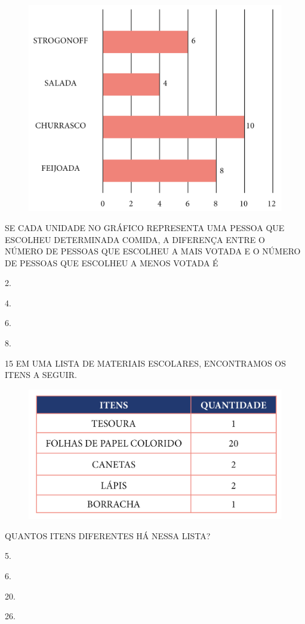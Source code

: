 \begin{figure}[htpb!]
\centering
\includegraphics[width=.8\textwidth]{./media/SAEB_1ANO_MAT_FIGURA141.png}
\end{figure}

\pagebreak
SE CADA UNIDADE NO GRÁFICO REPRESENTA UMA PESSOA QUE ESCOLHEU DETERMINADA COMIDA,
A DIFERENÇA ENTRE O NÚMERO DE PESSOAS QUE ESCOLHEU A MAIS VOTADA E O NÚMERO DE
PESSOAS QUE ESCOLHEU A MENOS VOTADA É

\begin{escolha}[itemsep=0pt]
\item 2.

\item 4.

\item 6.

\item 8.
\end{escolha}


\num{15} EM UMA LISTA DE MATERIAIS ESCOLARES, ENCONTRAMOS OS ITENS A SEGUIR.

\begin{figure}[htpb!]
\centering
\includegraphics[width=.8\textwidth]{./media/SAEB_1ANO_MAT_FIGURA142.png}
\end{figure}

QUANTOS ITENS DIFERENTES HÁ NESSA LISTA?

\begin{escolha}[itemsep=0pt]
\item 5.

\item 6.

\item 20.

\item 26.
\end{escolha}